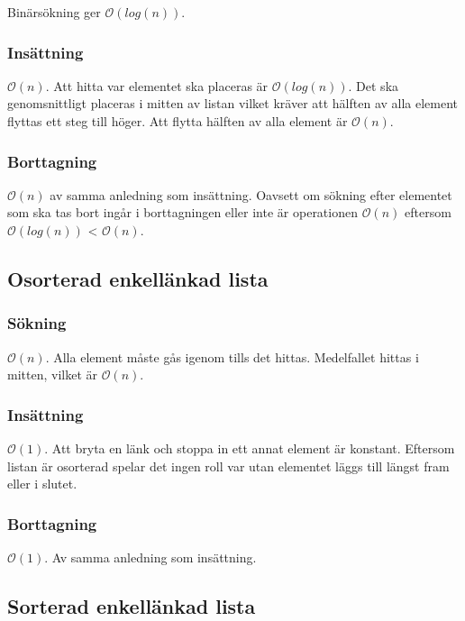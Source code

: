 \documentclass[a4paper,10pt,twoside]{article}
\newcommand{\Ordo}[1]{$\mathcal{O}(#1)$}
\begin{document}
		Binärsökning ger \Ordo{log(n)}.

		\subsubsection*{Insättning}

		\Ordo{n}. Att hitta var elementet ska placeras är \Ordo{log(n)}. Det ska genomsnittligt placeras i mitten av listan vilket kräver att hälften av alla element flyttas ett steg till höger. Att flytta hälften av alla element är \Ordo{n}.

		\subsubsection*{Borttagning}

		\Ordo{n} av samma anledning som insättning. Oavsett om sökning efter elementet som ska tas bort ingår i borttagningen eller inte är operationen \Ordo{n} eftersom \Ordo{log(n)} < \Ordo{n}.

	\subsection{Osorterad enkellänkad lista}

		\subsubsection*{Sökning}

		\Ordo{n}. Alla element måste gås igenom tills det hittas. Medelfallet hittas i mitten, vilket är \Ordo{n}.

		\subsubsection*{Insättning}

		\Ordo{1}. Att bryta en länk och stoppa in ett annat element är konstant. Eftersom listan är osorterad spelar det ingen roll var utan elementet läggs till längst fram eller i slutet.

		\subsubsection*{Borttagning}

		\Ordo{1}. Av samma anledning som insättning.

	\subsection{Sorterad enkellänkad lista}
\end{document}
